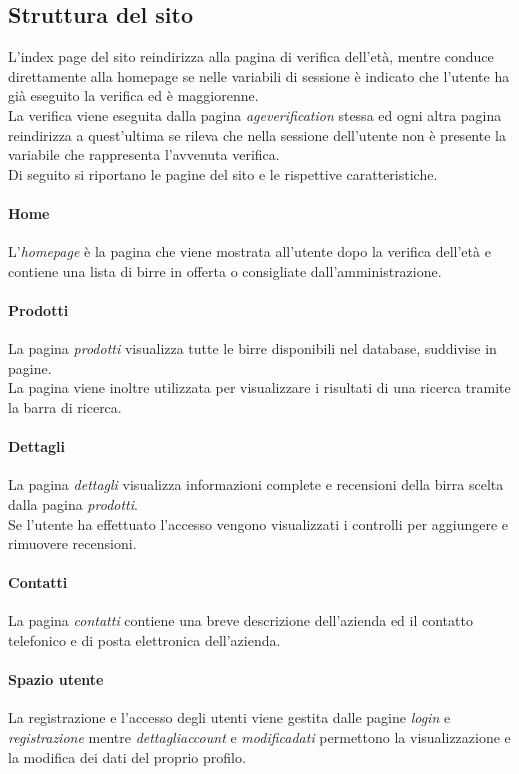\subsection{Struttura del sito}
L'index page del sito reindirizza alla pagina di verifica dell'età, mentre conduce direttamente alla homepage se nelle variabili di sessione è indicato che l'utente ha già eseguito la verifica ed è maggiorenne.\\
La verifica viene eseguita dalla pagina \textit{ageverification} stessa ed ogni altra pagina reindirizza a quest'ultima se rileva che nella sessione dell'utente non è presente la variabile che rappresenta l'avvenuta verifica.\\
Di seguito si riportano le pagine del sito e le rispettive caratteristiche.

\paragraph{Home}
L'\textit{homepage} è la pagina che viene mostrata all'utente dopo la verifica dell'età e contiene una lista di birre in offerta o consigliate dall'amministrazione.

\paragraph{Prodotti}
La pagina \textit{prodotti} visualizza tutte le birre disponibili nel database, suddivise in pagine.\\
La pagina viene inoltre utilizzata per visualizzare i risultati di una ricerca tramite la barra di ricerca.

\paragraph{Dettagli}
La pagina \textit{dettagli} visualizza informazioni complete e recensioni della birra scelta dalla pagina \textit{prodotti}.\\
Se l'utente ha effettuato l'accesso vengono visualizzati i controlli per aggiungere e rimuovere recensioni.

\paragraph{Contatti}
La pagina \textit{contatti} contiene una breve descrizione dell'azienda ed il contatto telefonico e di posta elettronica dell'azienda.

\paragraph{Spazio utente}
La registrazione e l'accesso degli utenti viene gestita dalle pagine \textit{login} e \textit{registrazione} mentre \textit{dettagliaccount} e \textit{modificadati} permettono la visualizzazione e la modifica dei dati del proprio profilo.

